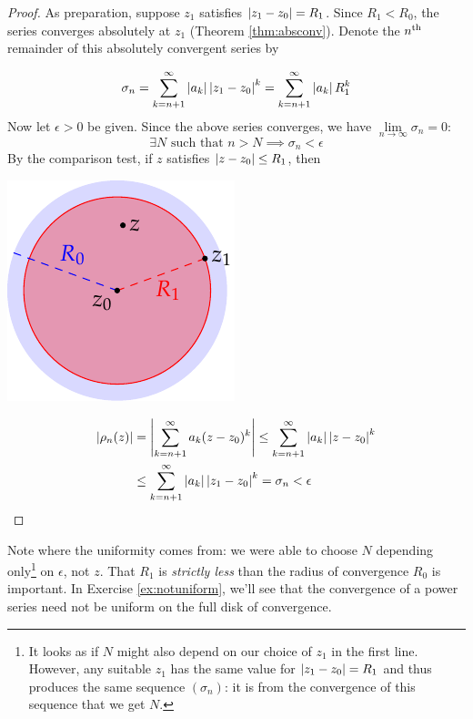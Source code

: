\begin{proof}
As preparation, suppose $z_1$ satisfies $\left| z_1-z_0\right|=R_1$. Since $R_1<R_0$, the series converges absolutely at $z_1$ (Theorem \ref{thm:absconv}). Denote the $n\textsuperscript{th}$ remainder of this absolutely convergent series by\par
\begin{minipage}[t]{0.7\linewidth}\vspace{-10pt}
\[\sigma_n=\sum_{k=n+1}^\infty\left| a_k\right|\left| z_1-z_0\right|^k =\sum_{k=n+1}^\infty\left| a_k\right|R_1^k\]
Now let $\epsilon>0$ be given. Since the above series converges, we have $\lim\limits_{n\to\infty}\sigma_n=0$:
\[\exists N\text{ such that }n>N\implies \sigma_n<\epsilon\tag{$\ast$}\]
By the comparison test, if $z$ satisfies $\left| z-z_0\right|\le R_1$, then
\end{minipage}\begin{minipage}[t]{0.3\linewidth}\vspace{0pt}
\flushright\includegraphics[scale=1]{uniform}
\end{minipage}\par\vspace{-4pt}
\begin{align*}
\left| \rho_n(z)\right|&=\left| \sum_{k=n+1}^\infty a_k(z-z_0)^k\right| \le \sum_{k=n+1}^\infty\left| a_k\right|\left| z-z_0\right|^k \\
&\le \sum_{k=n+1}^\infty\left| a_k\right|\left| z_1-z_0\right|^k=\sigma_n <\epsilon\tag*{\qedhere}
\end{align*}
\end{proof}

Note where the uniformity comes from: we were able to choose $N$ depending only\footnote{It looks as if $N$ might also depend on our choice of $z_1$ in the first line. However, any suitable $z_1$ has the same value for $\left| z_1-z_0\right|=R_1$ and thus produces the same sequence $(\sigma_n)$: it is from the convergence of this sequence that we get $N$.} on $\epsilon$, not $z$.\smallbreak
That $R_1$ is \emph{strictly less} than the radius of convergence $R_0$ is important. In Exercise \ref{ex:notuniform}, we'll see that the convergence of a power series need not be uniform on the full disk of convergence.
\goodbreak

